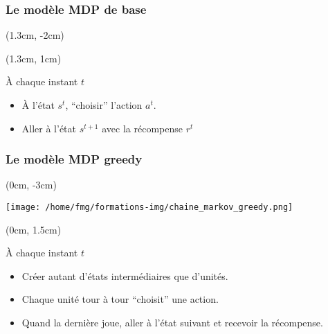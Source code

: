 \documentclass[smaller]{beamer}
\begin{document}
\begin{frame}
  \frametitle{Le modèle MDP de base}

  \begin{textblock*}{8.25cm}(1.3cm, -2cm)
    \centerline{\def\svgwidth{\columnwidth}}
  \end{textblock*}

  \begin{textblock*}{8.25cm}(1.3cm, 1cm)
    \begin{block}{À chaque instant $t$}
      \begin{itemize}
      \item À l'état $s^t$, ``choisir'' l'action $a^t$.
      \item Aller à l'état $s^{t+1}$ avec la récompense $r^t$
      \end{itemize}
    \end{block}
  \end{textblock*}


\end{frame}


\begin{frame}
  \frametitle{Le modèle MDP greedy}

  \begin{textblock*}{11cm}(0cm, -3cm)
    \centerline{\texttt{[image: /home/fmg/formations-img/chaine\_markov\_greedy.png]}}
  \end{textblock*}
  
  \begin{textblock*}{11cm}(0cm, 1.5cm)
    \begin{exampleblock}{À chaque instant $t$}
      \begin{itemize}
      \item Créer autant d'états intermédiaires que d'unités.
      \item Chaque unité tour à tour ``choisit'' une action.
      \item Quand la dernière joue, aller à l'état suivant et recevoir
        la récompense.
      \end{itemize}
    \end{exampleblock}
  \end{textblock*}

\end{frame}
\end{document}
